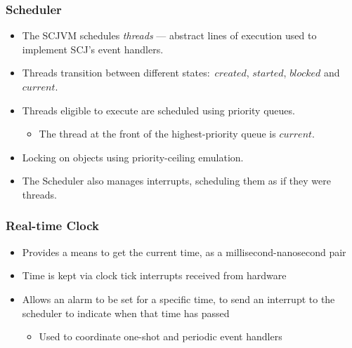 \documentclass{beamer}
\begin{document}
\begin{frame}[shrink]
  \frametitle{Scheduler}
  \begin{itemize}
  \item The SCJVM schedules \emph{threads} --- abstract lines of
  execution used to implement SCJ's event handlers.
  \item Threads transition between different states:~$created$, $started$,
    $blocked$ and $current$.
  \item Threads eligible to execute are scheduled using priority queues.
    \begin{itemize}
    \item The thread at the front of the highest-priority queue is $current$.
    \end{itemize}
  \item Locking on objects using priority-ceiling emulation.
  \item The Scheduler also manages interrupts, scheduling them as if
    they were threads.
  \end{itemize}
\end{frame}

\begin{frame}
  \frametitle{Real-time Clock}
  \begin{itemize}
  \item Provides a means to get the current time, as a millisecond-nanosecond pair
  \item Time is kept via clock tick interrupts received from hardware
  \item Allows an alarm to be set for a specific time, to send an
    interrupt to the scheduler to indicate when that time has passed
    \begin{itemize}
      \item Used to coordinate one-shot and periodic event handlers
    \end{itemize}
  \end{itemize}
\end{frame}
\end{document}

